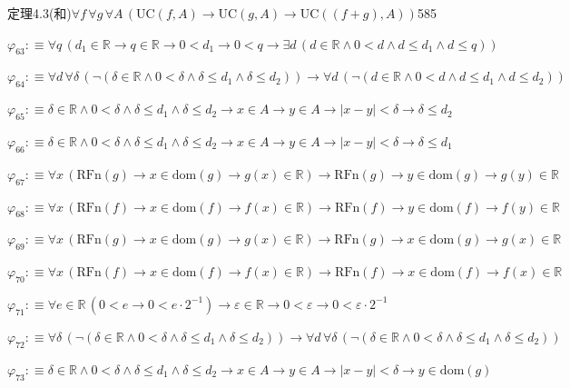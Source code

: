 \begin{fullproof}{定理4.3(和)}{$\forall f\,\forall g\,\forall A\,(\mathrm{UC}(f,A) \to \mathrm{UC}(g,A) \to \mathrm{UC}((f + g),A))$}{585}
\begin{abbrevlist}
\item $\varphi_{63} :\equiv \forall q\,(d_{1} \in \mathbb{R} \to q \in \mathbb{R} \to 0 < d_{1} \to 0 < q \to \exists d\,(d \in \mathbb{R} \land 0 < d \land d \leq d_{1} \land d \leq q))$
\item $\varphi_{64} :\equiv \forall d\,\forall \delta\,(\neg (\delta \in \mathbb{R} \land 0 < \delta \land \delta \leq d_{1} \land \delta \leq d_{2})) \to \forall d\,(\neg (d \in \mathbb{R} \land 0 < d \land d \leq d_{1} \land d \leq d_{2}))$
\item $\varphi_{65} :\equiv \delta \in \mathbb{R} \land 0 < \delta \land \delta \leq d_{1} \land \delta \leq d_{2} \to x \in A \to y \in A \to \lvert x - y \rvert < \delta \to \delta \leq d_{2}$
\item $\varphi_{66} :\equiv \delta \in \mathbb{R} \land 0 < \delta \land \delta \leq d_{1} \land \delta \leq d_{2} \to x \in A \to y \in A \to \lvert x - y \rvert < \delta \to \delta \leq d_{1}$
\item $\varphi_{67} :\equiv \forall x\,(\mathrm{RFn}(g) \to x \in \mathrm{dom}(g) \to g(x) \in \mathbb{R}) \to \mathrm{RFn}(g) \to y \in \mathrm{dom}(g) \to g(y) \in \mathbb{R}$
\item $\varphi_{68} :\equiv \forall x\,(\mathrm{RFn}(f) \to x \in \mathrm{dom}(f) \to f(x) \in \mathbb{R}) \to \mathrm{RFn}(f) \to y \in \mathrm{dom}(f) \to f(y) \in \mathbb{R}$
\item $\varphi_{69} :\equiv \forall x\,(\mathrm{RFn}(g) \to x \in \mathrm{dom}(g) \to g(x) \in \mathbb{R}) \to \mathrm{RFn}(g) \to x \in \mathrm{dom}(g) \to g(x) \in \mathbb{R}$
\item $\varphi_{70} :\equiv \forall x\,(\mathrm{RFn}(f) \to x \in \mathrm{dom}(f) \to f(x) \in \mathbb{R}) \to \mathrm{RFn}(f) \to x \in \mathrm{dom}(f) \to f(x) \in \mathbb{R}$
\item $\varphi_{71} :\equiv \forall e \in \mathbb{R}\,(0 < e \to 0 < e \cdot 2^{-1}) \to \varepsilon \in \mathbb{R} \to 0 < \varepsilon \to 0 < \varepsilon \cdot 2^{-1}$
\item $\varphi_{72} :\equiv \forall \delta\,(\neg (\delta \in \mathbb{R} \land 0 < \delta \land \delta \leq d_{1} \land \delta \leq d_{2})) \to \forall d\,\forall \delta\,(\neg (\delta \in \mathbb{R} \land 0 < \delta \land \delta \leq d_{1} \land \delta \leq d_{2}))$
\item $\varphi_{73} :\equiv \delta \in \mathbb{R} \land 0 < \delta \land \delta \leq d_{1} \land \delta \leq d_{2} \to x \in A \to y \in A \to \lvert x - y \rvert < \delta \to y \in \mathrm{dom}(g)$

\end{abbrevlist}
\end{fullproof}
